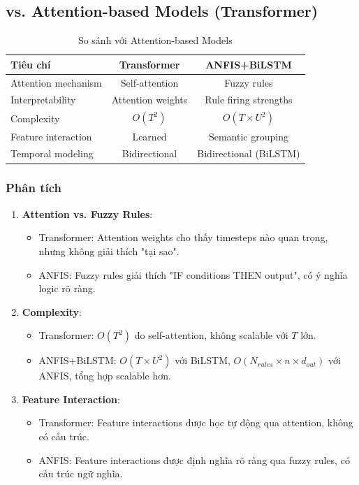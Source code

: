 \documentclass[12pt,a4paper]{article}
\begin{document}
\subsection{vs. Attention-based Models (Transformer)}

\begin{table}[h]
\centering
\caption{So sánh với Attention-based Models}
\begin{tabular}{lcc}
\toprule
\textbf{Tiêu chí} & \textbf{Transformer} & \textbf{ANFIS+BiLSTM} \\
\midrule
Attention mechanism & Self-attention & Fuzzy rules \\
Interpretability & Attention weights & Rule firing strengths \\
Complexity & $O(T^2)$ & $O(T \times U^2)$ \\
Feature interaction & Learned & Semantic grouping \\
Temporal modeling & Bidirectional & Bidirectional (BiLSTM) \\
\bottomrule
\end{tabular}
\end{table}

\subsubsection{Phân tích}

\begin{enumerate}
    \item \textbf{Attention vs. Fuzzy Rules}:
    \begin{itemize}
        \item Transformer: Attention weights cho thấy timesteps nào quan trọng, nhưng không giải thích "tại sao".
        \item ANFIS: Fuzzy rules giải thích "IF conditions THEN output", có ý nghĩa logic rõ ràng.
    \end{itemize}
    
    \item \textbf{Complexity}:
    \begin{itemize}
        \item Transformer: $O(T^2)$ do self-attention, không scalable với $T$ lớn.
        \item ANFIS+BiLSTM: $O(T \times U^2)$ với BiLSTM, $O(N_{rules} \times n \times d_{out})$ với ANFIS, tổng hợp scalable hơn.
    \end{itemize}
    
    \item \textbf{Feature Interaction}:
    \begin{itemize}
        \item Transformer: Feature interactions được học tự động qua attention, không có cấu trúc.
        \item ANFIS: Feature interactions được định nghĩa rõ ràng qua fuzzy rules, có cấu trúc ngữ nghĩa.
    \end{itemize}
\end{enumerate}
\end{document}

